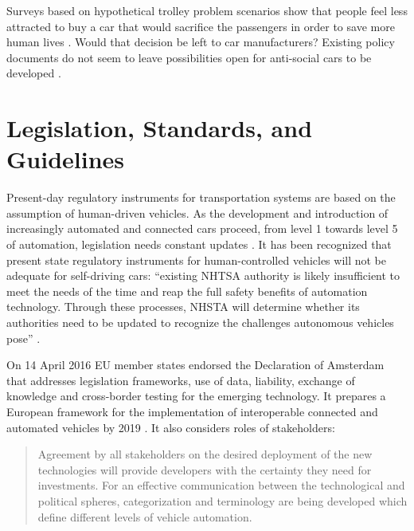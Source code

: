 Surveys based on hypothetical trolley problem scenarios show that people feel less attracted to buy a car that would sacrifice the passengers in order to save more human lives \cite{Bonnefon2016}. Would that decision be left to car manufacturers? Existing policy documents do not seem to leave possibilities open for anti-social cars to be developed \cite{EthicsCommission2017pr,EthicsCommission2017b,Pillath2016,NHTSA2016PolicyUpdate,DBLP:journals/corr/CharisiDFLMSSWY17} .


\section{Legislation, Standards, and Guidelines}
\label{sec:LegislationStandardGuidelines}

Present-day regulatory instruments for transportation systems are based on the assumption of human-driven vehicles. As the development and introduction of increasingly automated and connected cars proceed, from level 1 towards level 5 of automation, legislation needs constant updates \cite{EthicsCommission2017pr,EthicsCommission2017b,Pillath2016,NHTSA2016PolicyUpdate}. It has been recognized that present state regulatory instruments for human-controlled vehicles will not be adequate for self-driving cars:  \enquote{existing NHTSA authority is likely insufficient to meet the needs of the time and reap the full safety benefits of automation technology. Through these processes, NHSTA will determine whether its authorities need to be updated to recognize the challenges autonomous vehicles pose} \cite{NHTSA2016PolicyUpdate}.

On 14 April 2016 EU member states endorsed the Declaration of Amsterdam \cite{GovernmentNL2017} that addresses legislation frameworks, use of data, liability, exchange of knowledge and cross-border testing for the emerging technology. It prepares a European framework for the implementation of interoperable connected and automated vehicles by 2019 \cite{EthicsCommission2017b}. It also considers roles of stakeholders:

 \begin{quote}
 Agreement by all stakeholders on the desired deployment of the new technologies will provide developers with the certainty they need for investments. For an effective communication between the technological and political spheres, categorization and terminology are being developed which define different levels of vehicle automation. \cite{Pillath2016} %
 \end{quote} %
 
